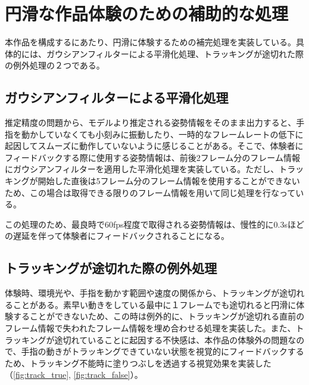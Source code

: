 \section{円滑な作品体験のための補助的な処理}
本作品を構成するにあたり、円滑に体験するための補完処理を実装している。具体的には、ガウシアンフィルターによる平滑化処理、トラッキングが途切れた際の例外処理の２つである。

\subsection{ガウシアンフィルターによる平滑化処理}
推定精度の問題から、モデルより推定される姿勢情報をそのまま出力すると、手指を動かしていなくても小刻みに振動したり、一時的なフレームレートの低下に起因してスムーズに動作していないように感じることがある。そこで、体験者にフィードバックする際に使用する姿勢情報は、前後2フレーム分のフレーム情報にガウシアンフィルターを適用した平滑化処理を実装している。ただし、トラッキングが開始した直後は5フレーム分のフレーム情報を使用することができないため、この場合は取得できる限りのフレーム情報を用いて同じ処理を行なっている。


この処理のため、最良時で60fps程度で取得される姿勢情報は、慢性的に0.3sほどの遅延を伴って体験者にフィードバックされることになる。

\subsection{トラッキングが途切れた際の例外処理}
体験時、環境光や、手指を動かす範囲や速度の関係から、トラッキングが途切れることがある。素早い動きをしている最中に１フレームでも途切れると円滑に体験することができないため、この時は例外的に、トラッキングが途切れる直前のフレーム情報で失われたフレーム情報を埋め合わせる処理を実装した。また、トラッキングが途切れていることに起因する不快感は、本作品の体験外の問題なので、手指の動きがトラッキングできていない状態を視覚的にフィードバックするため、トラッキング不能時に塗りつぶしを透過する視覚効果を実装した（\ref{fig:track_true}, \ref{fig:track_false}）。

